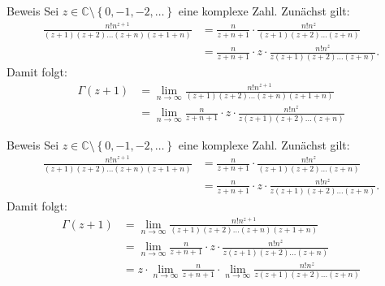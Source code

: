 \documentclass[10pt]{beamer}
\def\bC{\mathbb{C}}
\begin{document}
\begin{frame}{Beweis}
    Sei \( z \in \bC \setminus \left\{ 0, -1, -2, \ldots \right\} \) eine komplexe Zahl. Zunächst gilt:
    \begin{align*}
        \frac{n! n^{z + 1}}{\left( z + 1 \right) \left( z + 2 \right) \ldots \left( z + n \right) \left( z + 1 + n \right)}
        & = \frac{n}{z + n + 1} \cdot \frac{n! n^{z}}{\left( z + 1 \right) \left( z + 2 \right) \ldots \left( z + n \right)} \\
        & = \frac{n}{z + n + 1} \cdot z \cdot \frac{n! n^{z}}{z \left( z + 1 \right) \left( z + 2 \right) \ldots \left( z + n \right)}.
    \end{align*}
    Damit folgt:
    \begin{align*}
        \Gamma\left( z + 1 \right)
        & = \lim_{n \to \infty} \frac{n! n^{z + 1}}{\left( z + 1 \right) \left( z + 2 \right) \ldots \left( z + n \right) \left( z + 1 + n \right)} \\
        & = \lim_{n \to \infty} \frac{n}{z + n + 1} \cdot z \cdot \frac{n! n^{z}}{z \left( z + 1 \right) \left( z + 2 \right) \ldots \left( z + n \right)}
    \end{align*}
\end{frame}



\begin{frame}{Beweis}
    Sei \( z \in \bC \setminus \left\{ 0, -1, -2, \ldots \right\} \) eine komplexe Zahl. Zunächst gilt:
    \begin{align*}
        \frac{n! n^{z + 1}}{\left( z + 1 \right) \left( z + 2 \right) \ldots \left( z + n \right) \left( z + 1 + n \right)}
        & = \frac{n}{z + n + 1} \cdot \frac{n! n^{z}}{\left( z + 1 \right) \left( z + 2 \right) \ldots \left( z + n \right)} \\
        & = \frac{n}{z + n + 1} \cdot z \cdot \frac{n! n^{z}}{z \left( z + 1 \right) \left( z + 2 \right) \ldots \left( z + n \right)}.
    \end{align*}
    Damit folgt:
    \begin{align*}
        \Gamma\left( z + 1 \right)
        & = \lim_{n \to \infty} \frac{n! n^{z + 1}}{\left( z + 1 \right) \left( z + 2 \right) \ldots \left( z + n \right) \left( z + 1 + n \right)} \\
        & = \lim_{n \to \infty} \frac{n}{z + n + 1} \cdot z \cdot \frac{n! n^{z}}{z \left( z + 1 \right) \left( z + 2 \right) \ldots \left( z + n \right)} \\
        & = z \cdot \lim_{n \to \infty} \frac{n}{z + n + 1} \cdot \lim_{n \to \infty} \frac{n! n^{z}}{z \left( z + 1 \right) \left( z + 2 \right) \ldots \left( z + n \right)}
    \end{align*}
\end{frame}
\end{document}
